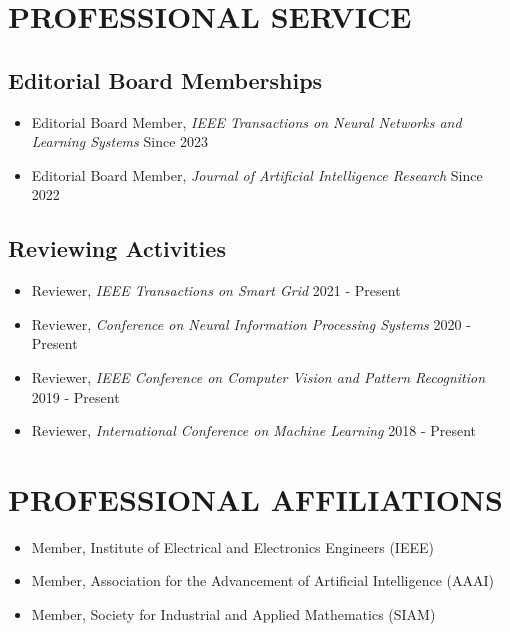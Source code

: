 \documentclass[a4paper,11pt]{article}
\begin{document}
\section{PROFESSIONAL SERVICE}
\subsection{Editorial Board Memberships}
\begin{itemize}[leftmargin=0.7cm,itemsep=0cm]
\item
Editorial Board Member, {\it IEEE Transactions on Neural Networks and Learning Systems} \hfill Since 2023
\item
Editorial Board Member, {\it Journal of Artificial Intelligence Research} \hfill Since 2022
\end{itemize}

\subsection{Reviewing Activities}
\begin{itemize}[leftmargin=0.7cm,itemsep=0cm]
\item
Reviewer, {\it IEEE Transactions on Smart Grid} \hfill 2021 - Present
\item
Reviewer, {\it Conference on Neural Information Processing Systems} \hfill 2020 - Present
\item
Reviewer, {\it IEEE Conference on Computer Vision and Pattern Recognition} \hfill 2019 - Present
\item
Reviewer, {\it International Conference on Machine Learning} \hfill 2018 - Present
\end{itemize}

\section{PROFESSIONAL AFFILIATIONS}
\begin{itemize}[leftmargin=0.7cm,itemsep=0cm]
\item
Member, Institute of Electrical and Electronics Engineers (IEEE)
\item Member, Association for the Advancement of Artificial Intelligence (AAAI)
\item Member, Society for Industrial and Applied Mathematics (SIAM)
\end{itemize}
\end{document}
